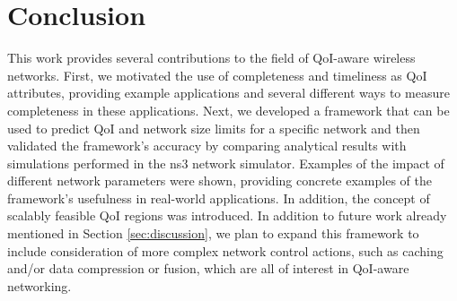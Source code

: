 
\section{Conclusion}
\label{sec:conclusion}

This work provides several contributions to the field of QoI-aware wireless networks.  
First, we motivated the use of completeness and timeliness as QoI attributes, providing example applications and several different ways to measure completeness in these applications.  
Next, we developed a framework that can be used to predict QoI and network size limits for a specific network and then validated the framework's accuracy by comparing analytical results with simulations performed in the ns3 network simulator.
Examples of the impact of different network parameters were shown, providing concrete examples of the framework's usefulness in real-world applications.  In addition, the concept of scalably feasible QoI regions was introduced.
In addition to future work already mentioned in Section \ref{sec:discussion}, we plan to expand this framework to include consideration of more complex network control actions, such as caching and/or data compression or fusion, which are all of interest in QoI-aware networking.